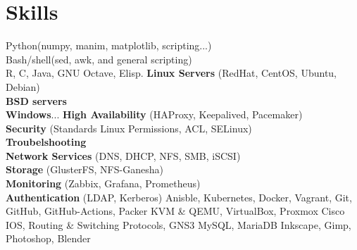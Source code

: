 \documentclass{cv}
\begin{document}
\section{Skills}
    {\textnormal{Python(numpy, manim, matplotlib, scripting...)\\ 
    Bash/shell(sed, awk, and general scripting) \\
    R, C, Java, GNU Octave, Elisp.}}
	{}
	{}
    {\textbf{Linux Servers} \textnormal{(RedHat, CentOS, Ubuntu, Debian)}\\
    \textbf{BSD servers}\\
    \textbf{Windows}...}
	{}
	{}
      {\textbf{High Availability} \textnormal{(HAProxy, Keepalived, Pacemaker)}\\
      \textbf{Security} \textnormal{(Standards Linux Permissions, ACL, SELinux)}\\
      \textbf{Troubelshooting}\\
      \textbf{Network Services} \textnormal{(DNS, DHCP, NFS, SMB, iSCSI)}\\
      \textbf{Storage} \textnormal{(GlusterFS, NFS-Ganesha)}\\ 
      \textbf{Monitoring} \textnormal{(Zabbix, Grafana, Prometheus)}\\ 
      \textbf{Authentication} \textnormal{(LDAP, Kerberos)}} 
	{}
	{}
	{Anisble, Kubernetes, Docker, Vagrant, Git, GitHub, GitHub-Actions, Packer}
	{}
	{}
    {KVM \& QEMU, VirtualBox, Proxmox}
	{}
	{}
    {Cisco IOS, Routing \& Switching Protocols, GNS3}
	{}
	{}
	{MySQL, MariaDB}
	{}
	{}
	{Inkscape, Gimp, Photoshop, Blender}
	{}
\end{document}

